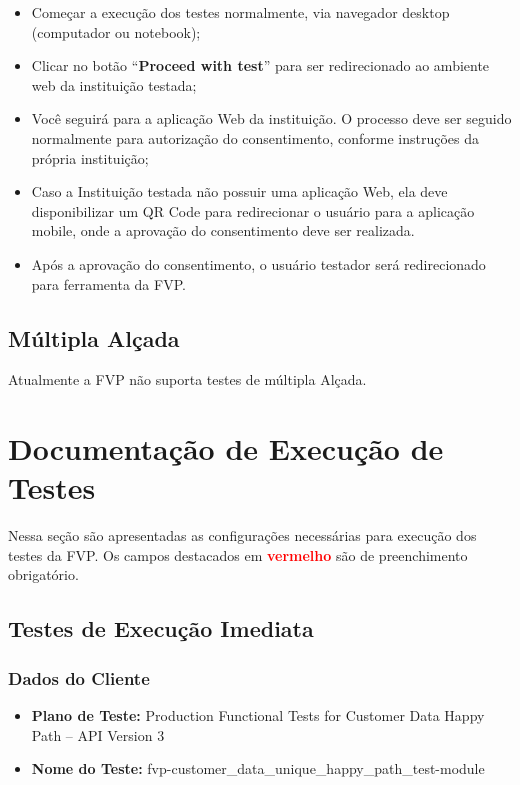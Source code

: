 \begin{itemize}
    \item Começar a execução dos testes normalmente, via navegador desktop (computador ou notebook);
    \item Clicar no botão “\textbf{Proceed with test}” para ser redirecionado ao ambiente web da instituição testada;
    \begin{figure}[H]
    \centering
    \label{fig:button}
    \end{figure}
    \item Você seguirá para a aplicação Web da instituição. O processo deve ser seguido normalmente para autorização do consentimento, conforme instruções da própria instituição;
    \item Caso a Instituição testada não possuir uma aplicação Web, ela deve disponibilizar um QR Code para redirecionar o usuário para a aplicação mobile, onde a aprovação do consentimento deve ser realizada.
    \item Após a aprovação do consentimento, o usuário testador será redirecionado para ferramenta da FVP.
\end{itemize}

\subsection{Múltipla Alçada}

Atualmente a FVP não suporta testes de múltipla Alçada.

\section{Documentação de Execução de Testes}

Nessa seção são apresentadas as configurações necessárias para execução dos testes da FVP. Os campos destacados em \textbf{\textcolor{red}{vermelho}} são de preenchimento obrigatório.

\subsection{Testes de Execução Imediata}

\subsubsection{Dados do Cliente}
\begin{itemize}
    \item \textbf{Plano de Teste:} Production Functional Tests for Customer Data Happy Path – API Version 3
    \item \textbf{Nome do Teste:} fvp-customer\_data\_unique\_happy\_path\_test-module
\end{itemize}

